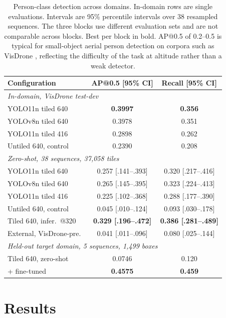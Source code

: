\documentclass[conference]{IEEEtran}
\begin{document}
\begin{table}[!t]
\centering
\caption{Person-class detection across domains. In-domain rows are single
evaluations. Intervals are 95\% percentile intervals over 38 resampled
sequences. The three blocks use different evaluation sets and are not comparable
across blocks. Best per block in bold. AP@0.5 of 0.2--0.5 is typical for
small-object aerial person detection on corpora such as VisDrone \cite{zhu2021},
reflecting the difficulty of the task at altitude rather than a weak detector.}
\label{tab:main}
\renewcommand{\arraystretch}{1.0}
\setlength{\tabcolsep}{3.5pt}
\begin{tabular}{lcc}
\toprule
Configuration & AP@0.5 [95\% CI] & Recall [95\% CI] \\
\midrule
\multicolumn{3}{l}{\textit{In-domain, VisDrone test-dev}} \\
YOLO11n tiled 640 & \textbf{0.3997} & \textbf{0.356} \\
YOLOv8n tiled 640 & 0.3978 & 0.351 \\
YOLO11n tiled 416 & 0.2898 & 0.262 \\
Untiled 640, control & 0.2390 & 0.208 \\
\midrule
\multicolumn{3}{l}{\textit{Zero-shot, 38 sequences, 37,058 tiles}} \\
YOLO11n tiled 640 & 0.257 [.141--.393] & 0.320 [.217--.416] \\
YOLOv8n tiled 640 & 0.265 [.145--.395] & 0.323 [.224--.413] \\
YOLO11n tiled 416 & 0.225 [.102--.368] & 0.288 [.177--.390] \\
Untiled 640, control & 0.045 [.010--.124] & 0.093 [.030--.178] \\
Tiled 640, infer.\ @320 & \textbf{0.329 [.196--.472]} & \textbf{0.386 [.281--.489]} \\
External, VisDrone-pre.\ \cite{shamrai2025} & 0.041 [.011--.096] & 0.080 [.025--.144] \\
\midrule
\multicolumn{3}{l}{\textit{Held-out target domain, 5 sequences, 1,499 boxes}} \\
Tiled 640, zero-shot & 0.0746 & 0.120 \\
\quad + fine-tuned & \textbf{0.4575} & \textbf{0.459} \\
\bottomrule
\end{tabular}
\end{table}

\section{Results}
\label{sec:results}
\end{document}
